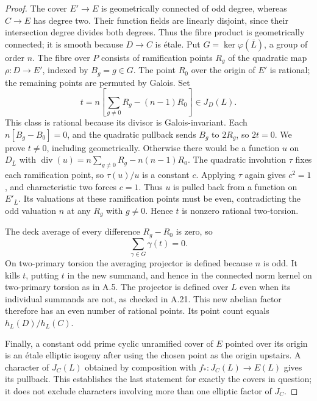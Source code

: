 \documentclass[11pt]{article}
\begin{document}
\begin{proof}
The cover $E'\to E$ is geometrically connected of odd degree, whereas
$C\to E$ has degree two.  Their function fields are linearly disjoint,
since their intersection degree divides both degrees.  Thus the fibre
product is geometrically connected; it is smooth because $D\to C$
is \'etale.  Put $G=\ker\varphi(\overline L)$, a group of order $n$.
The fibre over $P$ consists of ramification points $R_g$ of the
quadratic map $\rho:D\to E'$, indexed by $B_g=g\in G$.
The point $R_0$ over the origin of $E'$ is rational; the remaining
points are permuted by Galois.  Set
\[
        t=n\left[\sum_{g\ne0}R_g-(n-1)R_0\right]\in J_D(L).
\]
This class is rational because its divisor is Galois-invariant.
Each $n[B_g-B_0]=0$, and the quadratic pullback sends $B_g$ to
$2R_g$, so $2t=0$.  We prove $t\ne0$, including geometrically.
Otherwise there would be a function $u$ on $D_{\overline L}$ with
$\operatorname{div}(u)=n\sum_{g\ne0}R_g-n(n-1)R_0$.
The quadratic involution $\tau$
fixes each ramification point, so $\tau(u)/u$ is a constant $c$.
Applying $\tau$ again gives $c^2=1$, and characteristic two forces
$c=1$.  Thus $u$ is pulled back from a function on $E'_{\overline L}$.
Its valuations at these ramification points must be even, contradicting
the odd valuation $n$ at any $R_g$ with $g\ne0$.
Hence $t$ is nonzero rational
two-torsion.

The deck average of every difference $R_g-R_0$ is zero, so
\[
                          \sum_{\gamma\in G}\gamma(t)=0.
\]
On two-primary torsion the averaging projector is defined because
$n$ is odd.  It kills $t$, putting $t$ in the new summand, and hence in
the connected norm kernel on two-primary torsion as in A.5.
The projector is defined over $L$ even when its individual summands
are not, as checked in A.21.
This new abelian factor therefore has an even number of rational
points.  Its point count equals $h_L(D)/h_L(C)$.

Finally, a constant odd prime cyclic unramified cover of $E$ pointed
over its origin is an \'etale elliptic isogeny after using the chosen
point as the origin upstairs.  A character of $J_C(L)$ obtained by
composition with $f_*:J_C(L)\to E(L)$ gives its pullback.  This
establishes the last statement for exactly the covers in question;
it does not exclude characters involving more than one elliptic
factor of $J_C$.
\end{proof}
\end{document}

